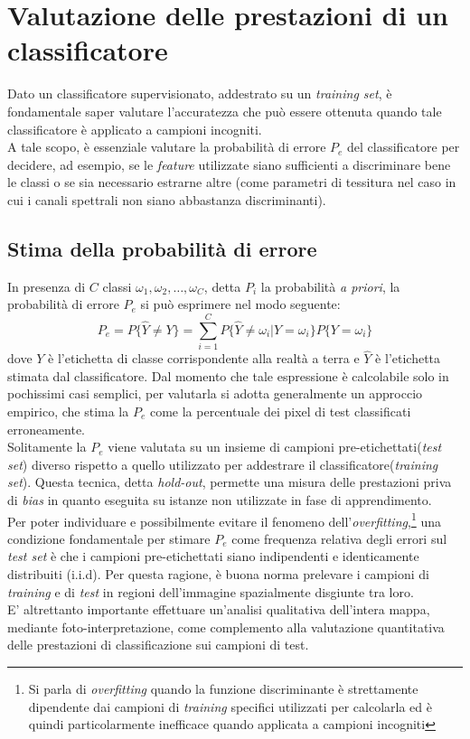 
\chapter{Valutazione delle prestazioni di un classificatore}
\label{cap:prestazioni}

Dato un classificatore supervisionato, addestrato su un \emph{training set}, è fondamentale saper valutare l'accuratezza che può essere ottenuta quando tale classificatore è applicato a campioni incogniti.\\
A tale scopo, è essenziale valutare la probabilità di errore $P_e$ del classificatore per decidere, ad esempio, se le \emph{feature} utilizzate siano sufficienti a discriminare bene le classi o se sia necessario estrarne altre (come parametri di tessitura nel caso in cui i canali spettrali non siano abbastanza discriminanti).
\clearpage

\section{Stima della probabilità di errore}
In presenza di $C$ classi $\omega_1,\omega_2, \ldots, \omega_C$, detta $P_i$ la probabilità \emph{a priori}, la probabilità di errore $P_e$ si può esprimere nel modo seguente:
\begin{equation}
\label{eq:P_e}
P_e = P\lbrace\widehat{Y}\neq Y\rbrace= {\sum_{i=1}^C P\lbrace\widehat{Y}\neq \omega_i\vert Y = \omega_i\rbrace}P\lbrace Y =\omega_i\rbrace
\end{equation}
dove $Y$ è l'etichetta di classe corrispondente alla realtà a terra e $\hat{Y}$ è l'etichetta stimata dal classificatore.
Dal momento che tale espressione è calcolabile solo in pochissimi casi semplici, per valutarla si adotta generalmente un approccio empirico, che stima la $P_e$ come la percentuale dei pixel di test classificati erroneamente.\\
Solitamente la $P_e$ viene valutata su un insieme di campioni pre-etichettati(\emph{test set}) diverso rispetto a quello utilizzato per addestrare il classificatore(\emph{training set}). Questa tecnica, detta \emph{hold-out}, permette una misura delle prestazioni priva di \emph{bias} in quanto eseguita su istanze non utilizzate in fase di apprendimento.\\
Per poter individuare e possibilmente evitare il fenomeno dell'\emph{overfitting},\footnote{Si parla di \emph{overfitting} quando la funzione discriminante è strettamente dipendente dai campioni di \emph{training} specifici utilizzati per calcolarla ed è quindi particolarmente inefficace quando applicata a campioni incogniti} una condizione fondamentale per stimare $P_e$ come frequenza relativa degli errori sul \emph{test set} è che i campioni pre-etichettati siano indipendenti e identicamente distribuiti (i.i.d). Per questa ragione, è buona norma prelevare i campioni di \emph{training} e di \emph{test} in regioni dell'immagine spazialmente disgiunte tra loro.\\
E' altrettanto importante effettuare un'analisi qualitativa dell'intera mappa, mediante foto-interpretazione, come complemento alla valutazione quantitativa delle prestazioni di classificazione sui campioni di test.


